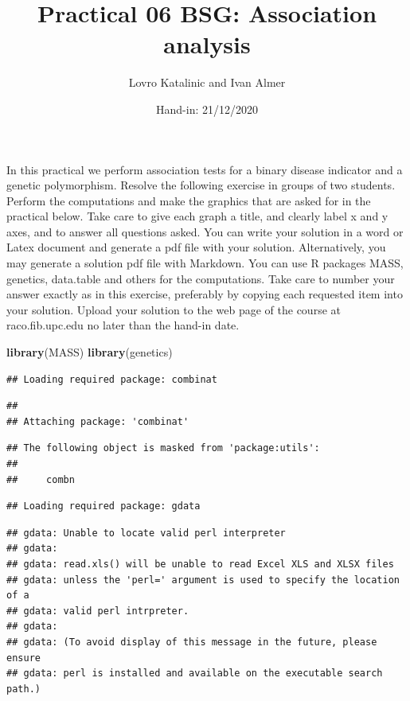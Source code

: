 \documentclass[
]{article}
\title{Practical 06 BSG: Association analysis}
\author{Lovro Katalinic and Ivan Almer}
\date{Hand-in: 21/12/2020}
\newenvironment{Shaded}{\begin{snugshade}}{\end{snugshade}}
\newcommand{\KeywordTok}[1]{\textcolor[rgb]{0.13,0.29,0.53}{\textbf{#1}}}
\newcommand{\NormalTok}[1]{#1}
\begin{document}
\maketitle

In this practical we perform association tests for a binary disease
indicator and a genetic polymorphism. Resolve the following exercise in
groups of two students. Perform the computations and make the graphics
that are asked for in the practical below. Take care to give each graph
a title, and clearly label x and y axes, and to answer all questions
asked. You can write your solution in a word or Latex document and
generate a pdf file with your solution. Alternatively, you may generate
a solution pdf file with Markdown. You can use R packages MASS,
genetics, data.table and others for the computations. Take care to
number your answer exactly as in this exercise, preferably by copying
each requested item into your solution. Upload your solution to the web
page of the course at raco.fib.upc.edu no later than the hand-in date.

\begin{Shaded}
\begin{Highlighting}[]
\KeywordTok{library}\NormalTok{(MASS)}
\KeywordTok{library}\NormalTok{(genetics)}
\end{Highlighting}
\end{Shaded}

\begin{verbatim}
## Loading required package: combinat
\end{verbatim}

\begin{verbatim}
## 
## Attaching package: 'combinat'
\end{verbatim}

\begin{verbatim}
## The following object is masked from 'package:utils':
## 
##     combn
\end{verbatim}

\begin{verbatim}
## Loading required package: gdata
\end{verbatim}

\begin{verbatim}
## gdata: Unable to locate valid perl interpreter
## gdata: 
## gdata: read.xls() will be unable to read Excel XLS and XLSX files
## gdata: unless the 'perl=' argument is used to specify the location of a
## gdata: valid perl intrpreter.
## gdata: 
## gdata: (To avoid display of this message in the future, please ensure
## gdata: perl is installed and available on the executable search path.)
\end{verbatim}
\end{document}
